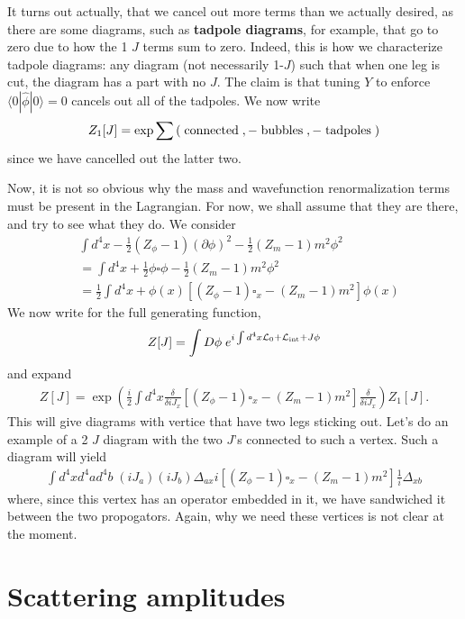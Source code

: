 \documentclass{../mathnotes}
\begin{document}
It turns out actually, that we cancel out more terms than we actually desired, as there are some diagrams, such as \textbf{tadpole diagrams},
for example, that go to zero due to how the 1 $J$ terms sum to zero. Indeed, this is how we characterize tadpole diagrams: any diagram
(not necessarily 1-$J$) such that when one leg is cut, the diagram has a part with no $J$. The claim is that tuning $Y$ to enforce
$\langle 0|\hat\phi|0\rangle=0$ cancels out all of the tadpoles.
We now write
\begin{align*}
    Z_1[J]=\exp\sum\left( \;\textnormal{connected}\;, -\;\textnormal{bubbles}\;,-\;\textnormal{tadpoles}\;\right)
\end{align*}
since we have cancelled out the latter two.

Now, it is not so obvious why the mass and wavefunction renormalization terms must be present in the Lagrangian. For now, we shall assume that
they are there, and try to see what they do. We consider
\begin{align*}
    &\int d^4x -\frac{1}{2}(Z_\phi-1)(\partial\phi)^2-\frac{1}{2}(Z_m-1)m^2\phi^2\\
    &=\int d^4x +\frac{1}{2}\phi\square\phi-\frac{1}{2}(Z_m-1)m^2\phi^2\\
    &=\frac{1}{2}\int d^4x +\phi(x)\left[ (Z_\phi-1)\square_x-(Z_m-1)m^2 \right]\phi(x)
\end{align*}
We now write for the full generating function,
\begin{align*}
    Z[J]=\int D\phi\; e^{i\int d^4x \mathcal{L}_0+\mathcal{L}_{\rm int}+J\phi}
\end{align*}
and expand
\begin{align*}
    Z[J]=\exp\left( \frac{i}{2}\int d^4x\frac{\delta}{\delta iJ_x}\left[ (Z_\phi-1)\square_x-(Z_m-1)m^2 \right]\frac{\delta}{\delta iJ_x} \right)Z_1[J].
\end{align*}
This will give diagrams with vertice that have two legs sticking out. Let's do an example of a 2 $J$ diagram with the two $J$'s connected
to such a vertex. Such a diagram will yield
\begin{align*}
    \int d^4xd^4ad^4b\;(iJ_a)(iJ_b)\Delta_{ax}i\left[ (Z_\phi-1)\square_x-(Z_m-1)m^2 \right]\frac{1}{i}\Delta_{xb}
\end{align*}
where, since this vertex has an operator embedded in it, we have sandwiched it between the two propogators. Again, why we need these
vertices is not clear at the moment.

\section*{Scattering amplitudes}
\end{document}
